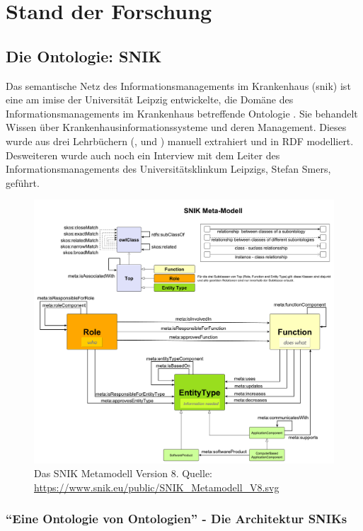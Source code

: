 \chapter{Stand der Forschung}\label{ch:relatedWork}

\section{Die Ontologie: SNIK}\label{sec:snik}

Das semantische Netz des Informationsmanagements im Krankenhaus (\ac{snik}) ist eine am \ac{imise} der Universität Leipzig entwickelte,
die Domäne des Informationsmanagements im Krankenhaus betreffende Ontologie \citep{domaene}.
Sie behandelt Wissen über Krankenhausinformationssysteme und deren Management.
Dieses wurde aus drei Lehrbüchern (\citet{bb}, \citet{ob} und \citet{he}) manuell extrahiert und in RDF modelliert.
Desweiteren wurde auch noch ein Interview mit dem Leiter des Informationsmanagements des Universitätsklinkum Leipzigs, Stefan Smers, geführt.

\begin{figure}
\centering
\includegraphics[width=.8\textwidth, height=.9\textheight, keepaspectratio]{Images/snik-metamodel.pdf}
\caption[SNIK Metamodell Version 8]{Das SNIK Metamodell Version 8. Quelle: \url{https://www.snik.eu/public/SNIK_Metamodell_V8.svg}}
\label{fig:snik-metamodel}
\end{figure}

\subsection{\enquote{Eine Ontologie von Ontologien} - Die Architektur SNIKs}


